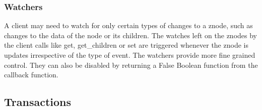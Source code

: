   \subsubsection{Watchers}
  A client may need to watch for only certain types of changes to a znode, such as changes to the data of the node or its children. The watches left on the znodes by the client calls like get, get\_children or set are triggered whenever the znode is updates irrespective of the type of event. The watchers provide more fine grained control. They can also be disabled by returning a False Boolean function from the callback function.
  
  \subsection{Transactions}